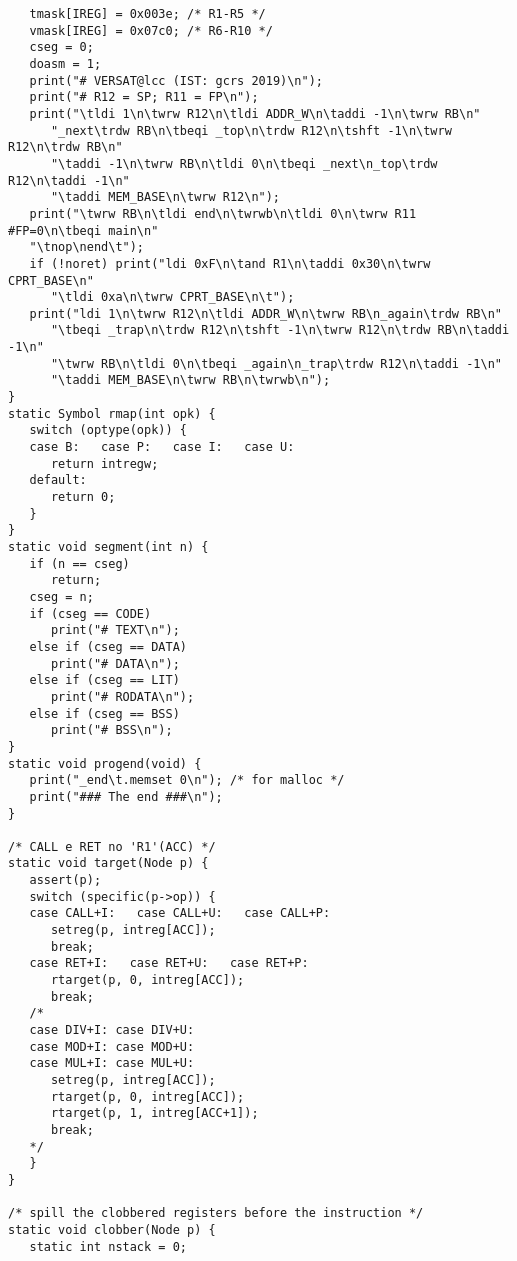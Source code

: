 {\begin{verbatim}
   tmask[IREG] = 0x003e; /* R1-R5 */
   vmask[IREG] = 0x07c0; /* R6-R10 */
   cseg = 0;
   doasm = 1;
   print("# VERSAT@lcc (IST: gcrs 2019)\n");
   print("# R12 = SP; R11 = FP\n");
   print("\tldi 1\n\twrw R12\n\tldi ADDR_W\n\taddi -1\n\twrw RB\n"
      "_next\trdw RB\n\tbeqi _top\n\trdw R12\n\tshft -1\n\twrw R12\n\trdw RB\n"
      "\taddi -1\n\twrw RB\n\tldi 0\n\tbeqi _next\n_top\trdw R12\n\taddi -1\n"
      "\taddi MEM_BASE\n\twrw R12\n");
   print("\twrw RB\n\tldi end\n\twrwb\n\tldi 0\n\twrw R11 #FP=0\n\tbeqi main\n"
   "\tnop\nend\t");
   if (!noret) print("ldi 0xF\n\tand R1\n\taddi 0x30\n\twrw CPRT_BASE\n"
      "\tldi 0xa\n\twrw CPRT_BASE\n\t");
   print("ldi 1\n\twrw R12\n\tldi ADDR_W\n\twrw RB\n_again\trdw RB\n"
      "\tbeqi _trap\n\trdw R12\n\tshft -1\n\twrw R12\n\trdw RB\n\taddi -1\n"
      "\twrw RB\n\tldi 0\n\tbeqi _again\n_trap\trdw R12\n\taddi -1\n"
      "\taddi MEM_BASE\n\twrw RB\n\twrwb\n");
}
static Symbol rmap(int opk) {
   switch (optype(opk)) {
   case B:   case P:   case I:   case U:
      return intregw;
   default:
      return 0;
   }
}
static void segment(int n) {
   if (n == cseg)
      return;
   cseg = n;
   if (cseg == CODE)
      print("# TEXT\n");
   else if (cseg == DATA)
      print("# DATA\n");
   else if (cseg == LIT)
      print("# RODATA\n");
   else if (cseg == BSS)
      print("# BSS\n");
}
static void progend(void) {
   print("_end\t.memset 0\n"); /* for malloc */
   print("### The end ###\n");
}

/* CALL e RET no 'R1'(ACC) */
static void target(Node p) {
   assert(p);
   switch (specific(p->op)) {
   case CALL+I:   case CALL+U:   case CALL+P:
      setreg(p, intreg[ACC]);
      break;
   case RET+I:   case RET+U:   case RET+P:
      rtarget(p, 0, intreg[ACC]);
      break;
   /*
   case DIV+I: case DIV+U:
   case MOD+I: case MOD+U:
   case MUL+I: case MUL+U:
      setreg(p, intreg[ACC]);
      rtarget(p, 0, intreg[ACC]);
      rtarget(p, 1, intreg[ACC+1]);
      break;
   */
   }
}

/* spill the clobbered registers before the instruction */
static void clobber(Node p) {
   static int nstack = 0;


\end{verbatim}}

